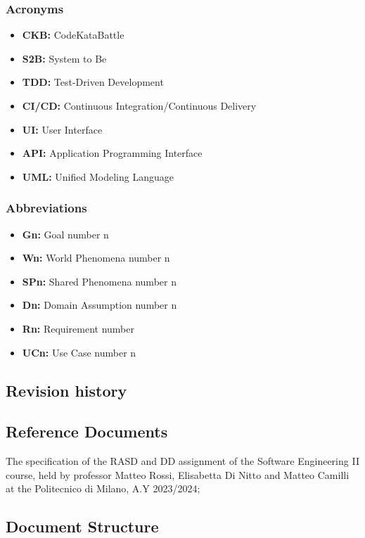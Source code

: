 \documentclass{article}
\begin{document}
\subsubsection{Acronyms}

\begin{itemize}
    \item \textbf{CKB:} CodeKataBattle
    \item \textbf{S2B:} System to Be
    \item \textbf{TDD:} Test-Driven Development
    \item \textbf{CI/CD:} Continuous Integration/Continuous Delivery
    \item \textbf{UI:} User Interface
    \item \textbf{API:} Application Programming Interface
    \item \textbf{UML:} Unified Modeling Language
\end{itemize}

\subsubsection{Abbreviations}

\begin{itemize}
    \item \textbf{Gn:} Goal number n
    \item \textbf{Wn:} World Phenomena number n
    \item \textbf{SPn:} Shared Phenomena number n
    \item \textbf{Dn:} Domain Assumption number n
    \item \textbf{Rn:} Requirement number 
    \item \textbf{UCn:} Use Case number n
\end{itemize}


\subsection{Revision history}
\subsection{Reference Documents}

The specification of the RASD and DD assignment of the Software
Engineering II course, held by professor Matteo Rossi, Elisabetta Di Nitto and
Matteo Camilli at the Politecnico di Milano, A.Y 2023/2024;

\subsection{Document Structure}
\end{document}
